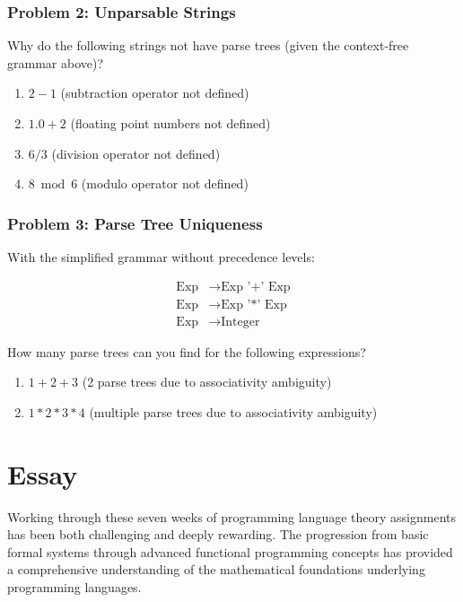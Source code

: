 \documentclass{article}
\theoremstyle{plain}
\theoremstyle{definition}
\theoremstyle{remark}
\begin{document}
\subsubsection{Problem 2: Unparsable Strings}

Why do the following strings not have parse trees (given the context-free grammar above)?

\begin{enumerate}[label=(\alph*)]
    \item $2-1$ (subtraction operator not defined)
    \item $1.0+2$ (floating point numbers not defined)
    \item $6/3$ (division operator not defined)
    \item $8 \bmod 6$ (modulo operator not defined)
\end{enumerate}

\subsubsection{Problem 3: Parse Tree Uniqueness}

With the simplified grammar without precedence levels:

\begin{align}
\text{Exp} &\to \text{Exp '+' Exp} \\
\text{Exp} &\to \text{Exp '*' Exp} \\
\text{Exp} &\to \text{Integer}
\end{align}

How many parse trees can you find for the following expressions?

\begin{enumerate}[label=(\alph*)]
    \item $1+2+3$ (2 parse trees due to associativity ambiguity)
    \item $1*2*3*4$ (multiple parse trees due to associativity ambiguity)
\end{enumerate}

\section{Essay}

Working through these seven weeks of programming language theory assignments has been both challenging and deeply rewarding. The progression from basic formal systems through advanced functional programming concepts has provided a comprehensive understanding of the mathematical foundations underlying programming languages.
\end{document}
